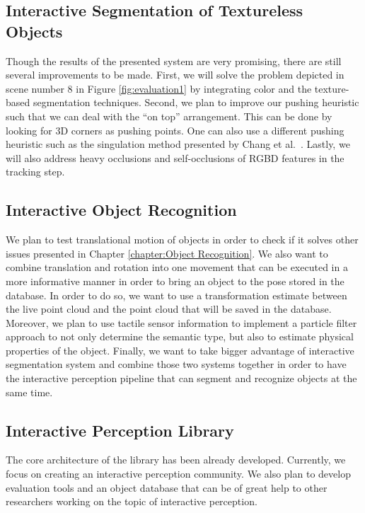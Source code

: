 \subsection{Interactive Segmentation of Textureless Objects}
Though the results of the presented system are very promising, there are still several improvements to be made. First, we
will solve the problem depicted in scene number 8 in Figure \ref{fig:evaluation1} by integrating color and the texture-based segmentation techniques.
Second, we plan to improve our pushing heuristic such that we
can deal with the ``on top'' arrangement. This can be done by
looking for 3D corners as pushing points. One can also use a
different pushing heuristic such as the singulation method presented by
Chang et al.~\cite{chang11interactive}. Lastly, we will also address heavy occlusions
and self-occlusions of RGBD features in the tracking step.


\subsection{Interactive Object Recognition}
We plan to test translational motion of objects in order to check if it solves other issues presented in Chapter \ref{chapter:Object Recognition}. We also want to combine translation and rotation into one movement that can be executed in a more informative manner in order to bring an object to the pose stored in the database. In order to do so, we want to use a transformation estimate between the live point cloud and the point cloud that will be saved in the database. Moreover, we plan to use tactile sensor information to implement a particle filter approach to not only determine the semantic type, but also to estimate physical properties of the object. Finally, we want to take bigger advantage of interactive segmentation system and combine those two systems together in order to have the interactive perception pipeline that can segment and recognize objects at the same time. 


\subsection{Interactive Perception Library}
The core architecture of the library has been already developed. Currently, we focus on creating an interactive perception community. We also plan to develop evaluation tools and an object database that can be of great help to other researchers working on the topic of interactive perception.